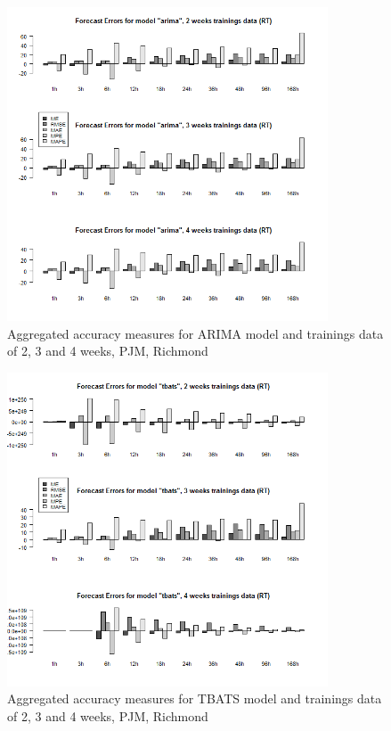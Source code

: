 \begin{figure}[!ht]
	\centering
		\includegraphics[width=0.85\textwidth]{figures/appendix_forecast_results/rt_sim_6_x_1w_1w_arima.png}
	\caption{Aggregated accuracy measures for ARIMA model and trainings data of 2, 3 and 4 weeks, PJM, Richmond}
	\label{fig:app_rt_sim_6_x_1w_1w_arima}
	\vspace*{-1.6in}
\end{figure}




\begin{figure}[!ht]
	\centering
		\includegraphics[width=0.85\textwidth]{figures/appendix_forecast_results/rt_sim_6_x_1w_1w_tbats.png}
	\caption{Aggregated accuracy measures for TBATS model and trainings data of 2, 3 and 4 weeks, PJM, Richmond}
	\label{fig:app_rt_sim_6_x_1w_1w_tbats}
\end{figure}

